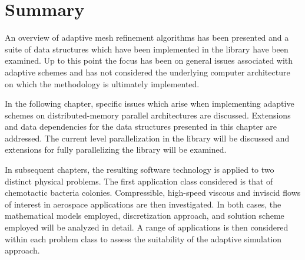 \section*{Summary}

An overview of adaptive mesh refinement algorithms has been presented
and a suite of data structures which have been implemented in the
\libMesh{} library have been examined.  Up to this point the focus has
been on general issues associated with adaptive schemes and has not
considered the underlying computer architecture on which the methodology is
ultimately implemented.

In the following chapter, specific issues which arise when implementing
adaptive schemes on distributed-memory parallel architectures are
discussed.  Extensions and data dependencies for the data structures
presented in this chapter are addressed.  The current level
parallelization in the \libMesh{} library will be discussed and
extensions for fully parallelizing the library will be examined.

In subsequent chapters, the resulting software technology is applied to
two distinct physical problems.  The first application class
considered is that of chemotactic bacteria colonies.  Compressible,
high-speed viscous and inviscid flows of interest in aerospace
applications are then investigated.  In both cases, the mathematical
models employed, discretization approach, and solution scheme employed
will be analyzed in detail.  A range of applications is then
considered within each problem class to assess the suitability of the
adaptive simulation approach.


